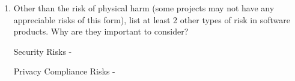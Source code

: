 \documentclass{article}
\begin{document}
\begin{enumerate}
    \item Other than the risk of physical harm (some projects may not have any
    appreciable risks of this form), list at least 2 other types of risk in
    software products. Why are they important to consider?

    Security Risks -

    Privacy Compliance Risks -


\end{enumerate}
\end{document}

